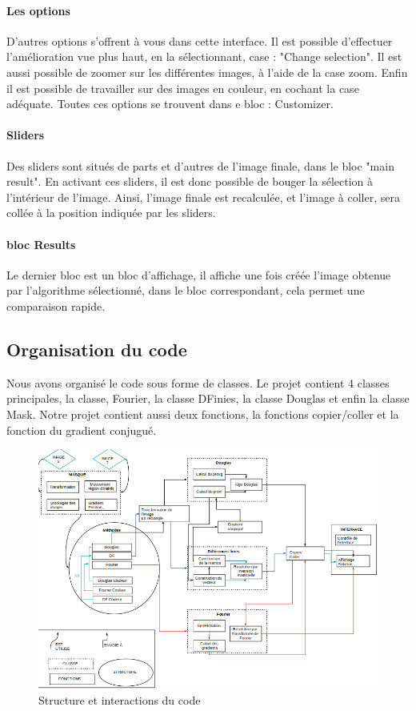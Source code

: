 \paragraph{Les options}
D'autres options s'offrent à vous dans cette interface. Il est possible d'effectuer l'amélioration vue plus haut, en la sélectionnant, case : "Change selection". Il est aussi possible de zoomer sur les différentes images, à l'aide de la case zoom. Enfin il est possible de travailler sur des images en couleur, en cochant la case adéquate. Toutes ces options se trouvent dans e bloc : Customizer.
\paragraph{Sliders}
Des sliders sont situés de parts et d'autres de l'image finale, dans le bloc "main result". En activant ces sliders, il est donc possible de bouger la sélection à l'intérieur de l'image. Ainsi, l'image finale est recalculée, et l'image à coller, sera collée à la position indiquée par les sliders.
\paragraph{bloc Results}
Le dernier bloc est un bloc d'affichage, il affiche une fois créée l'image obtenue par l'algorithme sélectionné, dans le bloc correspondant, cela permet une comparaison rapide.
\subsection{Organisation du code}
Nous avons organisé le code sous forme de classes. Le projet contient 4 classes principales, la classe, Fourier, la classe DFinies, la classe Douglas et enfin la classe  Mask. Notre projet contient aussi deux fonctions, la fonctions copier/coller et la fonction du gradient conjugué.


\begin{figure}[!h]
\includegraphics[scale=0.65]{Images/code/schema.png}
\caption{Structure et interactions du code}
\end{figure}
\newpage

